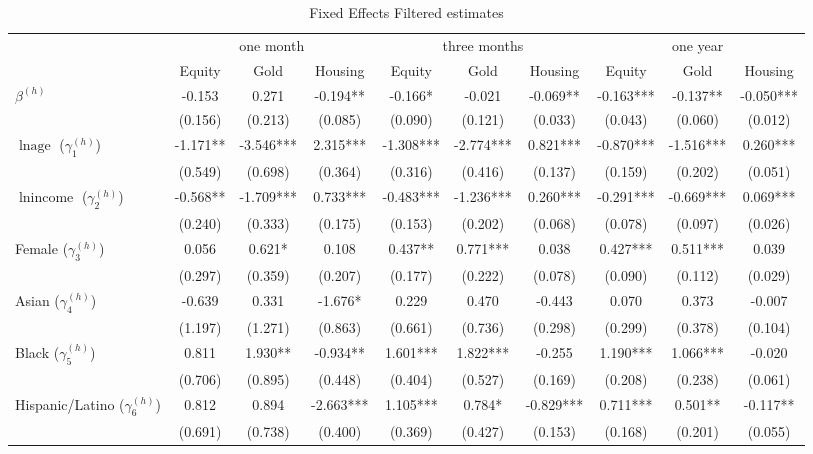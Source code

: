 \begin{table}[!h]\caption{Fixed Effects Filtered estimates}\centering 
\begin{threeparttable} 
\begin{tabular}{|l|ccc|ccc|ccc|}\toprule 
& \multicolumn{3}{c}{one month} & \multicolumn{3}{c}{three months}&\multicolumn{3}{c}{one year}   \\  
 & Equity & Gold & Housing & Equity  & Gold & Housing & Equity & Gold & Housing \\\midrule 
$\beta^{(h)}$ & -0.153 & 0.271 & -0.194** & -0.166* & -0.021 & -0.069** & -0.163*** & -0.137** & -0.050*** \\ 
 & (0.156) & (0.213) & (0.085)& (0.090) & (0.121) & (0.033)& (0.043) & (0.060) & (0.012) \\ 
$\ln \text{age}$ ($\gamma^{(h)}_1$) & -1.171** & -3.546*** & 2.315*** & -1.308*** & -2.774*** & 0.821*** & -0.870*** & -1.516*** & 0.260*** \\ 
 & (0.549) & (0.698) & (0.364)& (0.316) & (0.416) & (0.137)& (0.159) & (0.202) & (0.051) \\ 
$\ln \text{income}$ ($\gamma^{(h)}_2$) & -0.568** & -1.709*** & 0.733*** & -0.483*** & -1.236*** & 0.260*** & -0.291*** & -0.669*** & 0.069*** \\ 
 & (0.240) & (0.333) & (0.175)& (0.153) & (0.202) & (0.068)& (0.078) & (0.097) & (0.026) \\ 
Female ($\gamma^{(h)}_3$) & 0.056 & 0.621* & 0.108 & 0.437** & 0.771*** & 0.038 & 0.427*** & 0.511*** & 0.039 \\ 
 & (0.297) & (0.359) & (0.207)& (0.177) & (0.222) & (0.078)& (0.090) & (0.112) & (0.029) \\ 
Asian ($\gamma^{(h)}_4$) & -0.639 & 0.331 & -1.676* & 0.229 & 0.470 & -0.443 & 0.070 & 0.373 & -0.007 \\ 
 & (1.197) & (1.271) & (0.863)& (0.661) & (0.736) & (0.298)& (0.299) & (0.378) & (0.104) \\ 
Black ($\gamma^{(h)}_5$) & 0.811 & 1.930** & -0.934** & 1.601*** & 1.822*** & -0.255 & 1.190*** & 1.066*** & -0.020 \\ 
 & (0.706) & (0.895) & (0.448)& (0.404) & (0.527) & (0.169)& (0.208) & (0.238) & (0.061) \\ 
Hispanic/Latino ($\gamma^{(h)}_6$) & 0.812 & 0.894 & -2.663*** & 1.105*** & 0.784* & -0.829*** & 0.711*** & 0.501** & -0.117** \\ 
 & (0.691) & (0.738) & (0.400)& (0.369) & (0.427) & (0.153)& (0.168) & (0.201) & (0.055) \\ 

\end{tabular}
\end{threeparttable}
\end{table}
